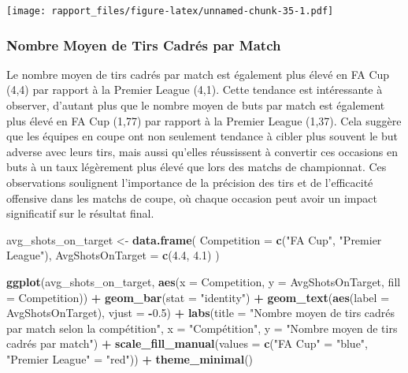 \documentclass[
]{article}
\newenvironment{Shaded}{\begin{snugshade}}{\end{snugshade}}
\newcommand{\AttributeTok}[1]{\textcolor[rgb]{0.13,0.29,0.53}{#1}}
\newcommand{\FloatTok}[1]{\textcolor[rgb]{0.00,0.00,0.81}{#1}}
\newcommand{\FunctionTok}[1]{\textcolor[rgb]{0.13,0.29,0.53}{\textbf{#1}}}
\newcommand{\NormalTok}[1]{#1}
\newcommand{\OtherTok}[1]{\textcolor[rgb]{0.56,0.35,0.01}{#1}}
\newcommand{\SpecialCharTok}[1]{\textcolor[rgb]{0.81,0.36,0.00}{\textbf{#1}}}
\newcommand{\StringTok}[1]{\textcolor[rgb]{0.31,0.60,0.02}{#1}}
\begin{document}
\texttt{[image: rapport\_files/figure-latex/unnamed-chunk-35-1.pdf]}

\subsubsection{Nombre Moyen de Tirs Cadrés par
Match}\label{nombre-moyen-de-tirs-cadruxe9s-par-match}

Le nombre moyen de tirs cadrés par match est également plus élevé en FA
Cup (4,4) par rapport à la Premier League (4,1). Cette tendance est
intéressante à observer, d'autant plus que le nombre moyen de buts par
match est également plus élevé en FA Cup (1,77) par rapport à la Premier
League (1,37). Cela suggère que les équipes en coupe ont non seulement
tendance à cibler plus souvent le but adverse avec leurs tirs, mais
aussi qu'elles réussissent à convertir ces occasions en buts à un taux
légèrement plus élevé que lors des matchs de championnat. Ces
observations soulignent l'importance de la précision des tirs et de
l'efficacité offensive dans les matchs de coupe, où chaque occasion peut
avoir un impact significatif sur le résultat final.

\begin{Shaded}
\begin{Highlighting}[]
\NormalTok{avg\_shots\_on\_target }\OtherTok{\textless{}{-}} \FunctionTok{data.frame}\NormalTok{(}
  \AttributeTok{Competition =} \FunctionTok{c}\NormalTok{(}\StringTok{"FA Cup"}\NormalTok{, }\StringTok{"Premier League"}\NormalTok{),}
  \AttributeTok{AvgShotsOnTarget =} \FunctionTok{c}\NormalTok{(}\FloatTok{4.4}\NormalTok{, }\FloatTok{4.1}\NormalTok{)}
\NormalTok{)}

\FunctionTok{ggplot}\NormalTok{(avg\_shots\_on\_target, }\FunctionTok{aes}\NormalTok{(}\AttributeTok{x =}\NormalTok{ Competition, }\AttributeTok{y =}\NormalTok{ AvgShotsOnTarget, }\AttributeTok{fill =}\NormalTok{ Competition)) }\SpecialCharTok{+}
  \FunctionTok{geom\_bar}\NormalTok{(}\AttributeTok{stat =} \StringTok{"identity"}\NormalTok{) }\SpecialCharTok{+}
  \FunctionTok{geom\_text}\NormalTok{(}\FunctionTok{aes}\NormalTok{(}\AttributeTok{label =}\NormalTok{ AvgShotsOnTarget), }\AttributeTok{vjust =} \SpecialCharTok{{-}}\FloatTok{0.5}\NormalTok{) }\SpecialCharTok{+}
  \FunctionTok{labs}\NormalTok{(}\AttributeTok{title =} \StringTok{"Nombre moyen de tirs cadrés par match selon la compétition"}\NormalTok{,}
       \AttributeTok{x =} \StringTok{"Compétition"}\NormalTok{, }\AttributeTok{y =} \StringTok{"Nombre moyen de tirs cadrés par match"}\NormalTok{) }\SpecialCharTok{+}
  \FunctionTok{scale\_fill\_manual}\NormalTok{(}\AttributeTok{values =} \FunctionTok{c}\NormalTok{(}\StringTok{"FA Cup"} \OtherTok{=} \StringTok{"blue"}\NormalTok{, }\StringTok{"Premier League"} \OtherTok{=} \StringTok{"red"}\NormalTok{)) }\SpecialCharTok{+}
  \FunctionTok{theme\_minimal}\NormalTok{()}
\end{Highlighting}
\end{Shaded}
\end{document}
